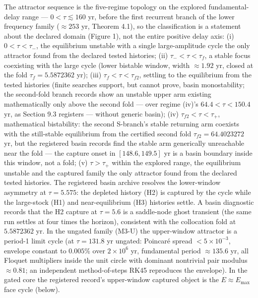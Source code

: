 \documentclass[11pt]{article}
\begin{document}
The attractor sequence is the five-regime topology on the explored
fundamental-delay range --- \(0 < \tau \lesssim 160\) yr, before the
first recurrent branch of the lower frequency family (\(\approx253\) yr,
Theorem 4.1), so the classification is a statement about the declared
domain (Figure 1), not the entire positive delay axis: (i)
\(0 < \tau < \tau_-\), the equilibrium unstable with a single
large-amplitude cycle the only attractor found from the declared tested
histories; (ii) \(\tau_- < \tau < \tau_f\), a stable focus coexisting
with the large cycle (lower bistable window, width \(\approx1.92\) yr,
closed at the fold \(\tau_f = 5.5872362\) yr); (iii)
\(\tau_f < \tau < \tau_{f2}\), settling to the equilibrium from the
tested histories (finite searches support, but cannot prove, basin
monostability; the second-fold branch records show an unstable upper arm
existing mathematically only above the second fold --- over regime
(iv)'s \(64.4 < \tau < 150.4\) yr, as Section 9.3 registers --- without
generic basin); (iv) \(\tau_{f2} < \tau < \tau_+\), mathematical
bistability: the second S-branch's stable returning arm coexists with
the still-stable equilibrium from the certified second fold
\(\tau_{f2} = 64.4023272\) yr, but the registered basin records find the
stable arm generically unreachable near the fold --- the capture onset
in \([148.6, 149.5]\) yr is a basin boundary inside this window, not a
fold; (v) \(\tau > \tau_+\) within the explored range, the equilibrium
unstable and the captured family the only attractor found from the
declared tested histories. The registered basin archive resolves the
lower-window asymmetry at \(\tau = 5.575\): the depleted history (H2) is
captured by the cycle while the large-stock (H1) and near-equilibrium
(H3) histories settle. A basin diagnostic records that the H2 capture at
\(\tau = 5.6\) is a saddle-node ghost transient (the same run settles at
four times the horizon), consistent with the collocation fold at
\(5.5872362\) yr. In the ungated family (M3-U) the upper-window
attractor is a period-1 limit cycle (at \(\tau = 131.8\) yr ungated:
Poincar\'e spread \(<5\times10^{-3}\), envelope constant to \(0.005\%\)
over \(2\times10^6\) yr, fundamental period \(\approx135.6\) yr, all
Floquet multipliers inside the unit circle with dominant nontrivial pair
modulus \(\approx0.81\); an independent method-of-steps RK45 reproduces
the envelope). In the gated core the registered record's upper-window
captured object is the \(E \approx E_{\max}\) face cycle (below).
\end{document}
